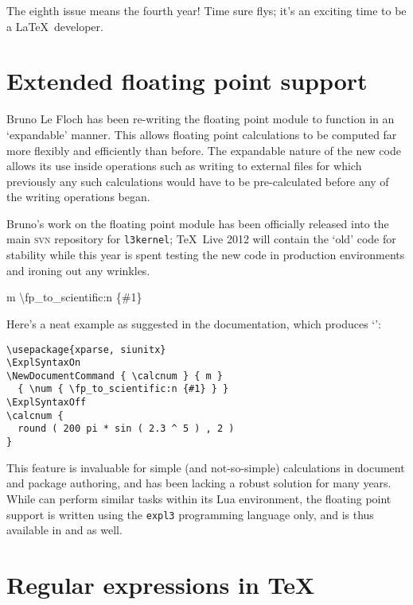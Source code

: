 \documentclass{ltnews}
\begin{document}
\maketitle

The eighth issue means the fourth year!
Time sure flys; it's an exciting time to be a \LaTeX\ developer.

\section{Extended floating point support}

Bruno Le Floch has been re-writing the floating point module to function in an `expandable' manner. This allows floating point calculations to be computed far more flexibly and efficiently than before.
The expandable nature of the new code allows its use inside operations such as writing to external files for which previously any such calculations would have to be pre-calculated before any of the writing operations began.

Bruno's work on the floating point module has been officially released into the main \textsc{svn} repository for \texttt{l3kernel}; \TeX\ Live 2012 will contain the `old' code for stability while this year is spent testing the new code in production environments and ironing out any wrinkles.

\ExplSyntaxOn
\NewDocumentCommand { \calcnum } { m }
  { \num { \fp_to_scientific:n {#1} } }
\ExplSyntaxOff

Here's a neat example as suggested in the documentation, which produces `':

\begin{verbatim}
\usepackage{xparse, siunitx} 
\ExplSyntaxOn
\NewDocumentCommand { \calcnum } { m }
  { \num { \fp_to_scientific:n {#1} } }
\ExplSyntaxOff
\calcnum {
  round ( 200 pi * sin ( 2.3 ^ 5 ) , 2 )
}
\end{verbatim}

This feature is invaluable for simple (and not-so-simple) calculations in document and package authoring, and has been lacking a robust solution for many years.
While  can perform similar tasks within its Lua environment, the floating point support is written using the \texttt{expl3} programming language only, and is thus available in  and  as well.

\section{Regular expressions in \TeX}
\end{document}
